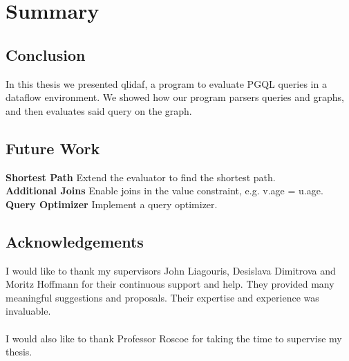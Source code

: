 \documentclass[11pt,singlecolumn]{scrartcl}
\begin{document}

\section{Summary}

\subsection{Conclusion}
In this thesis we presented qlidaf, a program to evaluate PGQL queries in a dataflow environment. We showed how our program parsers queries and graphs, and then evaluates said query on the graph.
\subsection{Future Work}
\textbf{Shortest Path} \quad Extend the evaluator to find the shortest path.\\
\textbf{Additional Joins} \quad Enable joins in the value constraint, e.g. v.age = u.age.\\
\textbf{Query Optimizer} \quad Implement a query optimizer.
\subsection{Acknowledgements}
I would like to thank my supervisors John Liagouris, Desislava Dimitrova and Moritz Hoffmann for their continuous support and help. They provided many meaningful suggestions and proposals. Their expertise and experience was invaluable.\\\\
I would also like to thank Professor Roscoe for taking the time to supervise my thesis.

\clearpage


{}

\end{document}

